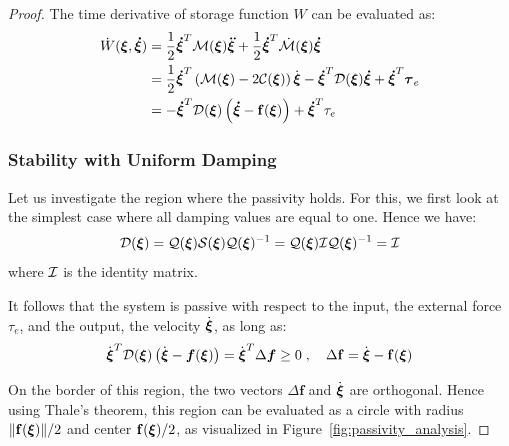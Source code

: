 \begin{proof}
The time derivative of storage function $W$ can be evaluated as:
\begin{gather}
  \begin{split}
    \dot W(\boldsymbol{\xi}, \boldsymbol{\dot \xi}) &=
    \frac{1}{2} \boldsymbol{\dot \xi}^T \mathcal{M}(\boldsymbol{\xi}) \boldsymbol{\ddot \xi}  + \frac{1}{2} \boldsymbol{\dot \xi}^T \dot{\mathcal{M}}(\boldsymbol{\xi}) \boldsymbol{\dot \xi} \\
    &= \frac{1}{2} \boldsymbol{\dot \xi}^T \left( \mathcal{M}(\boldsymbol{\xi}) - 2 \mathcal{C}(\boldsymbol{\xi}) \right) \dot{\boldsymbol{\xi}} - \boldsymbol{\dot \xi}^T \mathcal{D}(\boldsymbol{\xi}) \boldsymbol{\dot \xi} + \boldsymbol{\dot \xi}^T \boldsymbol{\tau}_e \\
  &= - \boldsymbol{\dot \xi}^T \mathcal{D}(\boldsymbol{\xi}) \left( \boldsymbol{\dot\xi} - \mathbf{f}(\boldsymbol{\xi}) \right) + \boldsymbol{\dot\xi}^T \tau_e
  \end{split}
\end{gather}


\subsubsection{Stability with Uniform Damping}
Let us investigate the region where the passivity holds. For this, we first look at the simplest case where all damping values are equal to one. Hence we have:
\begin{equation}
	\mathcal{D}({\boldsymbol{\xi}}) = \mathcal{Q}({\boldsymbol{\xi}}) \mathcal{S} ({\boldsymbol{\xi}}) \mathcal{Q}({\boldsymbol{\xi}})^{-1}= \mathcal{Q}({\boldsymbol{\xi}}) \mathcal{I} \mathcal{Q}({\boldsymbol{\xi}})^{-1} = \mathcal{I}
\end{equation}
where $\mathcal{I}$ is the identity matrix.

It follows that the system is passive with respect to the input, the external force $\tau_e$, and the output, the velocity $\dot {\boldsymbol{\xi}}$, as long as:
\begin{equation}
	\dot{\boldsymbol {\boldsymbol{\xi}}}^T \mathcal{D}({\boldsymbol{\xi}}) \left(\dot{\boldsymbol {\boldsymbol{\xi}}} - \boldsymbol{f}(\boldsymbol {\boldsymbol{\xi}}) \right) = 
    \dot{{\boldsymbol{\xi}}} ^ T \Delta \boldsymbol{f}  \geq 0 
 \; , \quad
 \Delta \mathbf{f} = \dot{{\boldsymbol{\xi}}} - \mathbf{f}({\boldsymbol{\xi}})
\end{equation}

On the border of this region, the two vectors $\Delta \mathbf{f}$ and $\dot{\mathbf {\boldsymbol{\xi}}}$ are orthogonal.
Hence using Thale's theorem, this region can be evaluated as a circle with radius $\| \mathbf{f} ({\boldsymbol{\xi}}) \| / 2$ and center $\mathbf{f}(\mathbf {\boldsymbol{\xi}}) / 2$, as visualized in Figure~\ref{fig:passivity_analysis}.


\end{proof}
